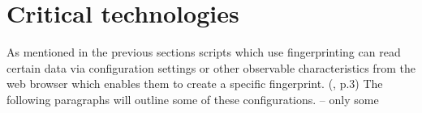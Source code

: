\section{Critical technologies}

As mentioned in the previous sections scripts which use fingerprinting can read certain data via configuration settings or other observable characteristics from the web browser which enables them to create a specific fingerprint. (\textcite{doty18}, p.3) The following paragraphs will outline some of these configurations. 
-- only some

